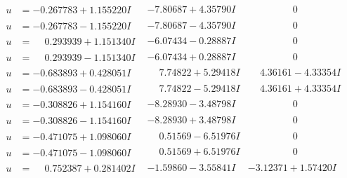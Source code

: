 \documentclass[1p]{elsarticle_modified}
\theoremstyle{definition}
\begin{document}
$$\begin{array}{c|c|c}
\begin{aligned}
u &= -0.267783 + 1.155220 I\end{aligned}
 & -7.80687 + 4.35790 I & \phantom{-0.000000 } 0 \\ \hline\begin{aligned}
u &= -0.267783 - 1.155220 I\end{aligned}
 & -7.80687 - 4.35790 I & \phantom{-0.000000 } 0 \\ \hline\begin{aligned}
u &= \phantom{-}0.293939 + 1.151340 I\end{aligned}
 & -6.07434 - 0.28887 I & \phantom{-0.000000 } 0 \\ \hline\begin{aligned}
u &= \phantom{-}0.293939 - 1.151340 I\end{aligned}
 & -6.07434 + 0.28887 I & \phantom{-0.000000 } 0 \\ \hline\begin{aligned}
u &= -0.683893 + 0.428051 I\end{aligned}
 & \phantom{-}7.74822 + 5.29418 I & \phantom{-}4.36161 - 4.33354 I \\ \hline\begin{aligned}
u &= -0.683893 - 0.428051 I\end{aligned}
 & \phantom{-}7.74822 - 5.29418 I & \phantom{-}4.36161 + 4.33354 I \\ \hline\begin{aligned}
u &= -0.308826 + 1.154160 I\end{aligned}
 & -8.28930 - 3.48798 I & \phantom{-0.000000 } 0 \\ \hline\begin{aligned}
u &= -0.308826 - 1.154160 I\end{aligned}
 & -8.28930 + 3.48798 I & \phantom{-0.000000 } 0 \\ \hline\begin{aligned}
u &= -0.471075 + 1.098060 I\end{aligned}
 & \phantom{-}0.51569 - 6.51976 I & \phantom{-0.000000 } 0 \\ \hline\begin{aligned}
u &= -0.471075 - 1.098060 I\end{aligned}
 & \phantom{-}0.51569 + 6.51976 I & \phantom{-0.000000 } 0 \\ \hline\begin{aligned}
u &= \phantom{-}0.752387 + 0.281402 I\end{aligned}
 & -1.59860 - 3.55841 I & -3.12371 + 1.57420 I \\ \hline\begin{aligned}

\end{aligned}
\end{array}$$
\end{document}
